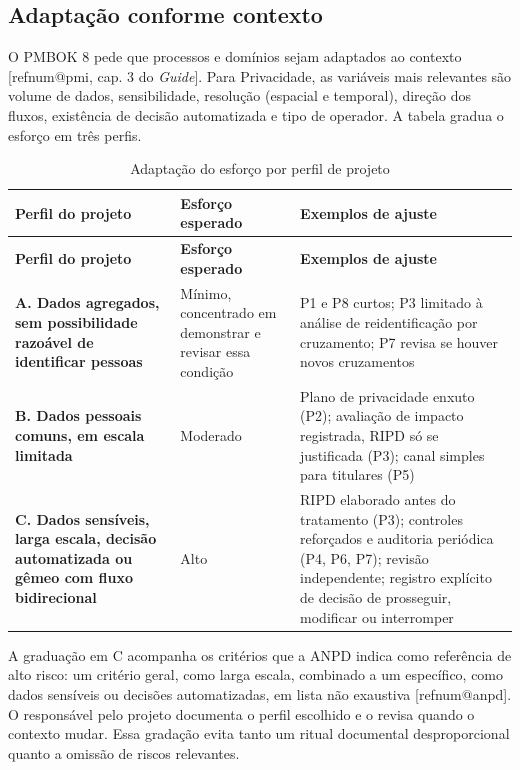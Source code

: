 \documentclass[11pt,a4paper]{article}
\makeatletter
\newcommand{\refnum}[1]{\csname refnum@#1\endcsname}
\newcommand{\cit}[1]{[\refnum{#1}]}
\newcommand{\SingleSpacing}{}
\newcommand{\fontetab}[1]{\par\vspace{3pt}{\small\noindent Fonte: #1\par}}
\makeatother
\begin{document}
\subsection{Adaptação conforme contexto}

O PMBOK 8 pede que processos e domínios sejam adaptados ao contexto [\refnum{pmi}, cap. 3 do \textit{Guide}]. Para Privacidade, as variáveis mais relevantes são volume de dados, sensibilidade, resolução (espacial e temporal), direção dos fluxos, existência de decisão automatizada e tipo de operador. A tabela gradua o esforço em três perfis.

\begingroup\SingleSpacing\small
\begin{longtable}{@{}>{\raggedright\arraybackslash}p{}>{\raggedright\arraybackslash}p{}>{\raggedright\arraybackslash}p{}@{}}
\caption{Adaptação do esforço por perfil de projeto}\label{tab:t5}\\
\toprule
\textbf{Perfil do projeto} & \textbf{Esforço esperado} & \textbf{Exemplos de ajuste}\\
\midrule
\endfirsthead
\toprule
\textbf{Perfil do projeto} & \textbf{Esforço esperado} & \textbf{Exemplos de ajuste}\\
\midrule
\endhead
\bottomrule
\endfoot
\bottomrule
\endlastfoot
\textbf{A. Dados agregados, sem possibilidade razoável de identificar pessoas} & Mínimo, concentrado em demonstrar e revisar essa condição & P1 e P8 curtos; P3 limitado à análise de reidentificação por cruzamento; P7 revisa se houver novos cruzamentos\\[3pt]
\textbf{B. Dados pessoais comuns, em escala limitada} & Moderado & Plano de privacidade enxuto (P2); avaliação de impacto registrada, RIPD só se justificada (P3); canal simples para titulares (P5)\\[3pt]
\textbf{C. Dados sensíveis, larga escala, decisão automatizada ou gêmeo com fluxo bidirecional} & Alto & RIPD elaborado antes do tratamento (P3); controles reforçados e auditoria periódica (P4, P6, P7); revisão independente; registro explícito de decisão de prosseguir, modificar ou interromper\\[3pt]
\end{longtable}
\endgroup
\fontetab{Elaborado pelos autores (2026), com base em \cit{anpd}.}

A graduação em C acompanha os critérios que a ANPD indica como referência de alto risco: um critério geral, como larga escala, combinado a um específico, como dados sensíveis ou decisões automatizadas, em lista não exaustiva [\refnum{anpd}]. O responsável pelo projeto documenta o perfil escolhido e o revisa quando o contexto mudar. Essa gradação evita tanto um ritual documental desproporcional quanto a omissão de riscos relevantes.
\end{document}
